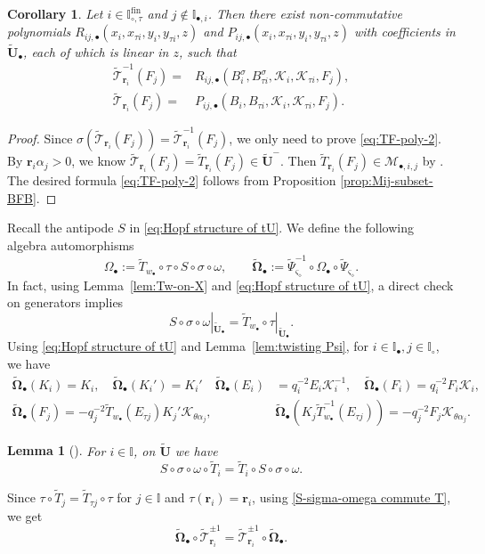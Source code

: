 \documentclass[a4paper,reqno,12pt]{amsart}
\numberwithin{equation}{section}
\newtheorem{lemma}[proposition]{Lemma}
\newtheorem{corollary}[proposition]{Corollary}
\theoremstyle{definition}
\theoremstyle{plain}
\theoremstyle{definition}
\def\I{\mathbb I}
\def\bI{\I_\bullet}
\def\wI{\I_\circ}
\def\bIi{\I_{\bullet,i}}
\def\bw{w_\bullet}
\def\br{\mathbf r}
\def\tU{\widetilde{\mathbf U}}
\def \tbU{\tU_{\bullet}}
\def\tTD{\widetilde T}
\def\tT{\widetilde{\mathscr T}}
\def\tPsi{\widetilde\Psi}
\def\cM{\mathcal M}
\def\cK{\mathcal K}
\def\bvs{\boldsymbol\varsigma}
\def\dm{\diamond}
\def \bvs{{\boldsymbol{\varsigma}}}
\def \wItau{\I_{\circ,\tau}}
\def \fwItau{\wItau^{\mathrm{fin}}}
\def \Ob{\Omega_\bullet}
\def \wObb{\widetilde{\mathbf{\Omega}}_\bullet}
\begin{document}
\begin{corollary}
     \label{cor:rktwoRPijb}
Let $i\in\fwItau$ and $j\notin \bIi$. Then there exist non-commutative polynomials $R_{ij,\bullet}(x_i,x_{\tau i}, y_i, y_{\tau i},z)$ and $P_{ij,\bullet}(x_i, x_{\tau i}, y_i, y_{\tau i}, z)$ with coefficients in $\tbU$, each of which is linear in $z$, such that
\begin{align}
  \tT_{\br_i}^{-1} (F_j) =& R_{ij,\bullet}(B_i^\sigma, B_{\tau i}^\sigma, \cK_i, \cK_{\tau i}, F_j),\label{eq:TF-poly-1}\\
  \tT_{\br_i}(F_j) =& P_{ij,\bullet}(B_i, B_{\tau i}, \cK_i, \cK_{\tau i}, F_j)\label{eq:TF-poly-2}.
\end{align}
\end{corollary}
\begin{proof}
    Since $\sigma(\tT_{\br_i}(F_j))=\tT_{\br_i}^{-1}(F_j)$, we only need to prove \eqref{eq:TF-poly-2}. By $\br_i\alpha_j>0$, we know $\tT_{\br_i}(F_j)=\tTD_{\br_i}(F_j)\in\tU^-$. Then $\tTD_{\br_i}(F_j)\in\cM_{\bullet,i,j}$ by \cite[Lemma 39.1.2]{Lus93}. The desired formula \eqref{eq:TF-poly-2} follows from Proposition \ref{prop:Mij-subset-BFB}.
\end{proof}

Recall the antipode $S$ in \eqref{eq:Hopf structure of tU}. We define the following algebra automorphisms
\begin{equation}\label{eq:auto-Omega}
 \Ob:=\tTD_{\bw}\circ\tau\circ S\circ\sigma\circ\omega,\qquad \wObb:=\tPsi_{\bvs_{\dm}}^{-1}\circ\Omega_{\bullet}\circ\tPsi_{\bvs_{\dm}}.
\end{equation}
In fact, using Lemma~\ref{lem:Tw-on-X} and \eqref{eq:Hopf structure of tU},
a direct check on generators implies
\begin{equation}\label{eq:S-sigma-omega=Tbw-tau}
S\circ\sigma\circ\omega|_{\tbU}=\tTD_{\bw}\circ\tau|_{\tbU}.   
\end{equation}
Using \eqref{eq:Hopf structure of tU} and Lemma~\ref{lem:twisting Psi}, for $i\in\bI,j\in\wI$, we have
\begin{equation}\label{eq:formula of wObb}
 \begin{aligned}
 \wObb(K_i)=K_i,\quad  \wObb(K_i')=K_i' \quad \wObb(E_i)&=q_i^{-2}E_i\cK_i^{-1},\quad \wObb(F_i)=q_i^{-2}F_i\cK_i,\\
 \wObb(F_j)=-q_j^{-2}\tTD_{\bw}( E_{\tau j}) K_j'\cK_{\theta\alpha_j},\qquad&\wObb(K_j\tTD_{\bw}^{-1}( E_{\tau j}))=-q_j^{-2}F_j\cK_{\theta\alpha_j}.
\end{aligned}   
\end{equation}
\begin{lemma}[{\cite[Lemma 7.1]{BK19}}]
  For $i\in\I$, on $\tU$ we have
  \begin{equation}\label{S-sigma-omega commute T}
S\circ\sigma\circ\omega\circ\tTD_i=\tTD_i\circ S\circ\sigma\circ\omega.
  \end{equation}
\end{lemma}
Since $\tau\circ\tTD_j=\tTD_{\tau j}\circ\tau$ for $j\in\I$ and $\tau(\br_i)=\br_i$, using \eqref{S-sigma-omega commute T}, we get
\begin{equation}\label{eq:wObb commute Tbr}
   \wObb\circ \tT_{\br_i}^{\pm1}=\tT_{\br_i}^{\pm1}\circ\wObb.
\end{equation}
\end{document}
